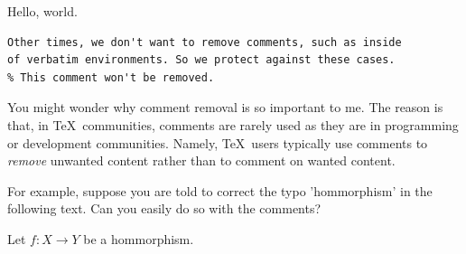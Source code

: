 \documentclass{article}
\def\foo#1{}
\begin{document}
Hello, world.

\foo{
  Sometimes \TeX\ authors will also create special macros for
  the purposes of commenting things out. We again remove these.
}

\begin{verbatim}
Other times, we don't want to remove comments, such as inside
of verbatim environments. So we protect against these cases.
% This comment won't be removed.
\end{verbatim} 

You might wonder why comment removal is so important to
me. The reason is that, in \TeX\ communities, comments are
rarely used as they are in programming or development
communities. Namely, \TeX\ users typically use comments to
\emph{remove} unwanted content rather than to comment on
wanted content.

For example, suppose you are told to correct the typo
'hommorphism' in the following text. Can you easily do so
with the comments?

\foo{Let $f:X \to Y be %
  a hommorphism.\iffalse
Let $f:X \to Y$ be a hommorphism.}
Let $f:X \to Y$ be a hommorphism.
\end{document}
